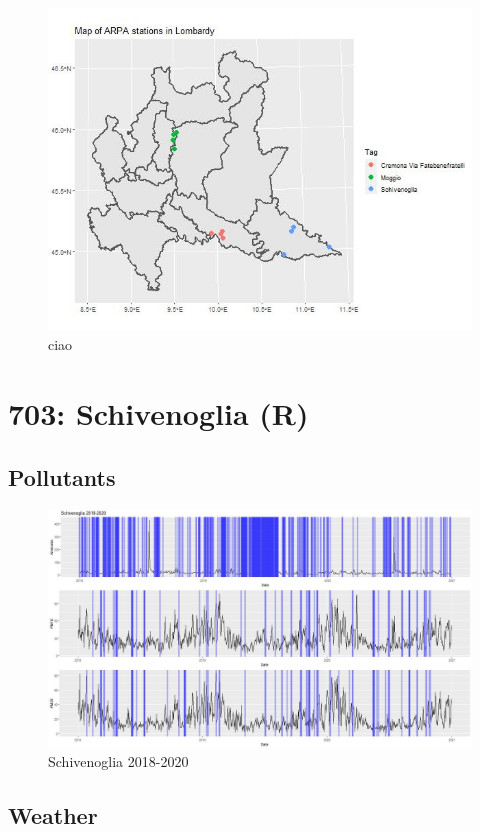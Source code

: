 \documentclass{article}
\begin{document}
\begin{figure}[H]
  \centering
  \includegraphics[scale = 0.4]{Picture/WStationsOfInterest.jpeg}
  \caption{ciao}
\end{figure}

\section{703: Schivenoglia (R)}
\subsection{Pollutants}
\begin{figure}[H]
  \centering
  \includegraphics[scale = 0.4]{Picture/Schivenoglia 2018-2020.jpeg}
  \caption{Schivenoglia 2018-2020}
  \centering
\end{figure}
\subsection{Weather}
\end{document}

